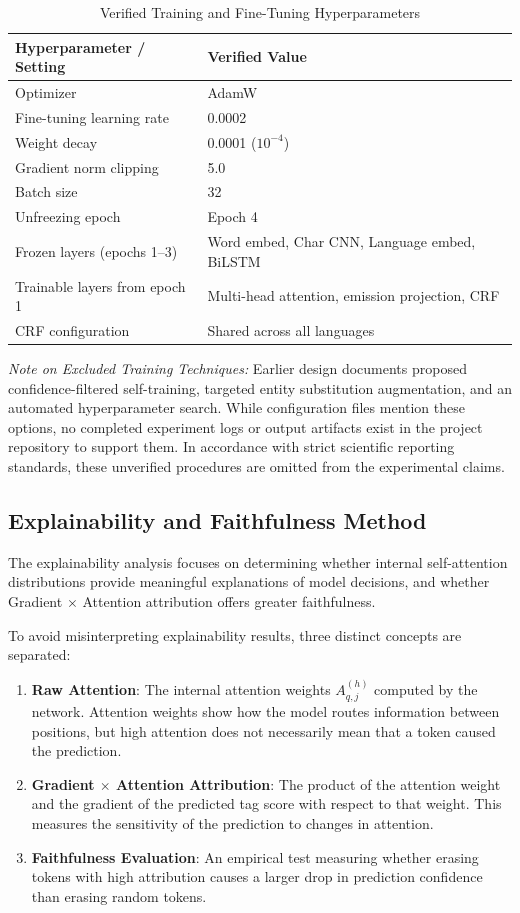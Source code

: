 \documentclass[pdflatex,sn-mathphys-num]{sn-jnl}
\begin{document}
\begin{table}[htbp]
\centering
\caption{Verified Training and Fine-Tuning Hyperparameters}
\label{tab:training}
\small
\begin{tabular}{ll}
\toprule
\textbf{Hyperparameter / Setting} & \textbf{Verified Value} \\
\midrule
Optimizer & AdamW \\
Fine-tuning learning rate & 0.0002 \\
Weight decay & 0.0001 ($10^{-4}$) \\
Gradient norm clipping & 5.0 \\
Batch size & 32 \\
Unfreezing epoch & Epoch 4 \\
Frozen layers (epochs 1--3) & Word embed, Char CNN, Language embed, BiLSTM \\
Trainable layers from epoch 1 & Multi-head attention, emission projection, CRF \\
CRF configuration & Shared across all languages \\
\bottomrule
\end{tabular}
\end{table}

\textit{Note on Excluded Training Techniques:} Earlier design documents proposed confidence-filtered self-training, targeted entity substitution augmentation, and an automated hyperparameter search. While configuration files mention these options, no completed experiment logs or output artifacts exist in the project repository to support them. In accordance with strict scientific reporting standards, these unverified procedures are omitted from the experimental claims.

\subsection{Explainability and Faithfulness Method}\label{subsec:explainability_method}

The explainability analysis focuses on determining whether internal self-attention distributions provide meaningful explanations of model decisions, and whether Gradient $\times$ Attention attribution offers greater faithfulness.

To avoid misinterpreting explainability results, three distinct concepts are separated:
\begin{enumerate}
    \item \textbf{Raw Attention}: The internal attention weights $A^{(h)}_{q, j}$ computed by the network. Attention weights show how the model routes information between positions, but high attention does not necessarily mean that a token caused the prediction.
    \item \textbf{Gradient $\times$ Attention Attribution}: The product of the attention weight and the gradient of the predicted tag score with respect to that weight. This measures the sensitivity of the prediction to changes in attention.
    \item \textbf{Faithfulness Evaluation}: An empirical test measuring whether erasing tokens with high attribution causes a larger drop in prediction confidence than erasing random tokens.
\end{enumerate}
\end{document}
